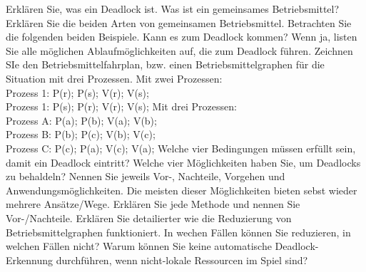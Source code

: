 \documentclass[ngerman,a4paper,12pt]{scrreprt}
\begin{document}
\olR
	\li Erklären Sie, was ein Deadlock ist.
	\li Was ist ein gemeinsames Betriebsmittel? Erklären Sie die beiden Arten von gemeinsamen Betriebsmittel.
	\li Betrachten Sie die folgenden beiden Beispiele. Kann es zum Deadlock kommen? Wenn ja, listen Sie alle möglichen Ablaufmöglichkeiten auf, die zum Deadlock führen. Zeichnen SIe den Betriebsmittelfahrplan, bzw. einen Betriebsmittelgraphen für die Situation mit drei Prozessen.
		\ul
			\li Mit zwei Prozessen: \\
			Prozess 1: P(r); P(s); V(r); V(s); \\
			Prozess 1: P(s); P(r); V(r); V(s);
			\li Mit drei Prozessen: \\
			Prozess A: P(a);  P(b);  V(a);  V(b); \\
			Prozess B:  P(b);   P(c);  V(b);  V(c); \\
			Prozess C:  P(c);  P(a);  V(c);  V(a); 
		\ulE 
	\li Welche vier Bedingungen müssen erfüllt sein, damit ein Deadlock eintritt?
	\li Welche vier Möglichkeiten haben Sie, um Deadlocks zu behaldeln? Nennen Sie jeweils Vor-, Nachteile, Vorgehen und Anwendungsmöglichkeiten. Die meisten dieser Möglichkeiten bieten sebst wieder mehrere Ansätze/Wege. Erklären Sie jede Methode und nennen Sie Vor-/Nachteile.
	\li Erklären Sie detailierter wie die Reduzierung von Betriebsmittelgraphen funktioniert. In wechen Fällen können Sie reduzieren, in welchen Fällen nicht?
	\li Warum können Sie keine automatische Deadlock-Erkennung durchführen, wenn nicht-lokale Ressourcen im Spiel sind?
\olS
\end{document}
